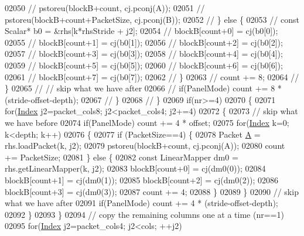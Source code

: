 \begin{DoxyCode}
{02050 \textcolor{comment}{//           pstoreu(blockB+count, cj.pconj(A));}
02051 \textcolor{comment}{//           pstoreu(blockB+count+PacketSize, cj.pconj(B));}
02052 \textcolor{comment}{//         \} else \{}
02053 \textcolor{comment}{//           const Scalar* b0 = &rhs[k*rhsStride + j2];}
02054 \textcolor{comment}{//           blockB[count+0] = cj(b0[0]);}
02055 \textcolor{comment}{//           blockB[count+1] = cj(b0[1]);}
02056 \textcolor{comment}{//           blockB[count+2] = cj(b0[2]);}
02057 \textcolor{comment}{//           blockB[count+3] = cj(b0[3]);}
02058 \textcolor{comment}{//           blockB[count+4] = cj(b0[4]);}
02059 \textcolor{comment}{//           blockB[count+5] = cj(b0[5]);}
02060 \textcolor{comment}{//           blockB[count+6] = cj(b0[6]);}
02061 \textcolor{comment}{//           blockB[count+7] = cj(b0[7]);}
02062 \textcolor{comment}{//         \}}
02063 \textcolor{comment}{//         count += 8;}
02064 \textcolor{comment}{//       \}}
02065 \textcolor{comment}{//       // skip what we have after}
02066 \textcolor{comment}{//       if(PanelMode) count += 8 * (stride-offset-depth);}
02067 \textcolor{comment}{//     \}}
02068 \textcolor{comment}{//   \}}
02069   \textcolor{keywordflow}{if}(nr>=4)
02070   \{
02071     \textcolor{keywordflow}{for}(\hyperlink{namespace_eigen_a62e77e0933482dafde8fe197d9a2cfde}{Index} j2=packet\_cols8; j2<packet\_cols4; j2+=4)
02072     \{
02073       \textcolor{comment}{// skip what we have before}
02074       \textcolor{keywordflow}{if}(PanelMode) count += 4 * offset;
02075       \textcolor{keywordflow}{for}(\hyperlink{namespace_eigen_a62e77e0933482dafde8fe197d9a2cfde}{Index} k=0; k<depth; k++)
02076       \{
02077         \textcolor{keywordflow}{if} (PacketSize==4) \{
02078           Packet \hyperlink{group___core___module_class_eigen_1_1_matrix}{A} = rhs.loadPacket(k, j2);
02079           pstoreu(blockB+count, cj.pconj(A));
02080           count += PacketSize;
02081         \} \textcolor{keywordflow}{else} \{
02082           \textcolor{keyword}{const} LinearMapper dm0 = rhs.getLinearMapper(k, j2);
02083           blockB[count+0] = cj(dm0(0));
02084           blockB[count+1] = cj(dm0(1));
02085           blockB[count+2] = cj(dm0(2));
02086           blockB[count+3] = cj(dm0(3));
02087           count += 4;
02088         \}
02089       \}
02090       \textcolor{comment}{// skip what we have after}
02091       \textcolor{keywordflow}{if}(PanelMode) count += 4 * (stride-offset-depth);
02092     \}
02093   \}
02094   \textcolor{comment}{// copy the remaining columns one at a time (nr==1)}
02095   \textcolor{keywordflow}{for}(\hyperlink{namespace_eigen_a62e77e0933482dafde8fe197d9a2cfde}{Index} j2=packet\_cols4; j2<cols; ++j2)
}
\end{DoxyCode}
